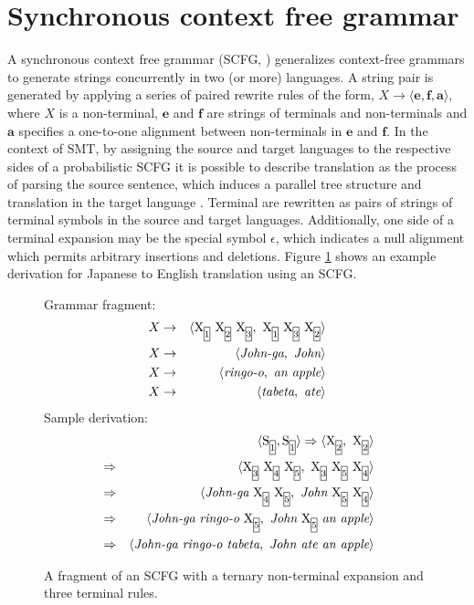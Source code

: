 \section{Synchronous context free grammar} \label{sec:scfg}

A synchronous context free grammar (SCFG, \cite{lewis68scfg}) generalizes context-free grammars to generate strings concurrently in two (or more) languages. A string pair is generated by applying a series of paired rewrite rules of the form, $X \rightarrow \langle \mathbf{e}, \mathbf{f}, \mathbf{a} \rangle$, where $X$ is a non-terminal, $\mathbf{e}$ and $\mathbf{f}$ are strings of terminals and non-terminals and $\mathbf{a}$ specifies a one-to-one alignment between non-terminals in $\mathbf{e}$ and $\mathbf{f}$.
In the context of SMT, by assigning the source and target languages to the respective sides of a probabilistic SCFG it is possible to describe translation as the process of parsing the source sentence, which induces a parallel tree structure and translation in the target language \cite{chiang07hierarchical}.  
Terminal are rewritten as pairs of strings of terminal symbols in the source and target languages.  Additionally, one side of a terminal expansion may be the special symbol $\epsilon$, which indicates a null alignment which permits arbitrary insertions and deletions.
Figure \ref{fig:scfg} shows an example derivation for Japanese to English translation using an SCFG.

\begin{figure}Grammar fragment:
\begin{eqnarray*}
\label{rule:discont}X & \rightarrow & \langle \nt{X}{1}\ \nt{X}{2}\ \nt{X}{3},\ \nt{X}{1}\ \nt{X}{3}\ \nt{X}{2} \rangle  \\
X & \rightarrow & \langle \textrm{\emph{John-ga}},\ \textrm{\emph{John}} \rangle  \\
X & \rightarrow & \langle \textrm{\emph{ringo-o}},\ \textrm{\emph{an apple}} \rangle  \\
X & \rightarrow & \langle \textrm{\emph{tabeta}},\ \textrm{\emph{ate}} \rangle
\end{eqnarray*}
Sample derivation:
\begin{eqnarray*}
\label{derivationt}
& &\langle \nt{S}{1},\nt{S}{1} \rangle \Rightarrow \langle \nt{X}{2},\ \nt{X}{2} \rangle \\
 & \Rightarrow&  \langle \nt{X}{3}\ \nt{X}{4}\ \nt{X}{5},\ \nt{X}{3}\ \nt{X}{5}\ \nt{X}{4} \rangle  \\
 & \Rightarrow &\langle \textrm{\emph{John-ga}}\ \nt{X}{4}\ \nt{X}{5},\ \textrm{\emph{John}}\ \nt{X}{5}\ \nt{X}{4} \rangle \\
 & \Rightarrow &\langle \textrm{\emph{John-ga}}\ \textrm{\emph{ringo-o}}\ \nt{X}{5},\ \textrm{\emph{John}}\ \nt{X}{5}\ \textrm{\emph{an apple}} \rangle \\
 & \Rightarrow &\langle \textrm{\emph{John-ga ringo-o tabeta}},\ \textrm{\emph{John ate an apple}} \rangle
\end{eqnarray*}
\caption{A fragment of an SCFG with a ternary non-terminal expansion and three terminal rules.}
\label{fig:scfg}
\end{figure}

